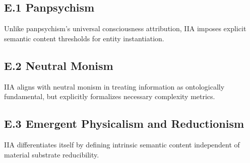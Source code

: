 \documentclass[12pt,a4paper]{article}
\begin{document}
\subsection{E.1 Panpsychism}

Unlike panpsychism's universal consciousness attribution, IIA imposes explicit semantic content thresholds for entity instantiation.

\subsection{E.2 Neutral Monism}

IIA aligns with neutral monism in treating information as ontologically fundamental, but explicitly formalizes necessary complexity metrics.

\subsection{E.3 Emergent Physicalism and Reductionism}

IIA differentiates itself by defining intrinsic semantic content independent of material substrate reducibility.
\end{document}
